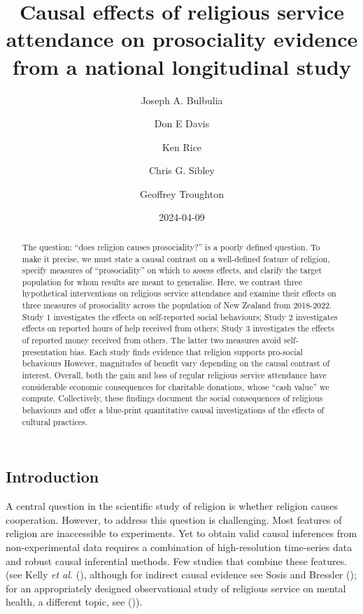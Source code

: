 \documentclass[
  single column]{article}
\title{Causal effects of religious service attendance on prosociality
evidence from a national longitudinal study}
\author{Joseph A. Bulbulia \and Don E Davis \and Ken Rice \and Chris G.
Sibley \and Geoffrey Troughton}
\date{2024-04-09}
\begin{document}
\maketitle
\begin{abstract}
The question: ``does religion causes prosociality?'' is a poorly defined
question. To make it precise, we must state a causal contrast on a
well-defined feature of religion, specify measures of ``prosociality''
on which to assess effects, and clarify the target population for whom
results are meant to generalise. Here, we contrast three hypothetical
interventions on religious service attendance and examine their effects
on three measures of prosociality across the population of New Zealand
from 2018-2022. Study 1 investigates the effects on self-reported social
behaviours; Study 2 investigates effects on reported hours of help
received from others; Study 3 investigates the effects of reported money
received from others. The latter two measures avoid self-presentation
bias. Each study finds evidence that religion supports pro-social
behaviours However, magnitudes of benefit vary depending on the causal
contrast of interest. Overall, both the gain and loss of regular
religious service attendance have considerable economic consequences for
charitable donations, whose ``cash value'' we compute. Collectively,
these findings document the social consequences of religious behaviours
and offer a blue-print quantitative causal investigations of the effects
of cultural practices.
\end{abstract}

\subsection{Introduction}\label{introduction}

A central question in the scientific study of religion is whether
religion causes cooperation. However, to address this question is
challenging. Most features of religion are inaccessible to experiments.
Yet to obtain valid causal inferences from non-experimental data
requires a combination of high-resolution time-series data and robust
causal inferential methods. Few studies that combine these features.
(see Kelly \emph{et al.} (),
although for indirect causal evidence see Sosis and Bressler
(); for an appropriately
designed observational study of religious service on mental health, a
different topic, see
()).
\end{document}
